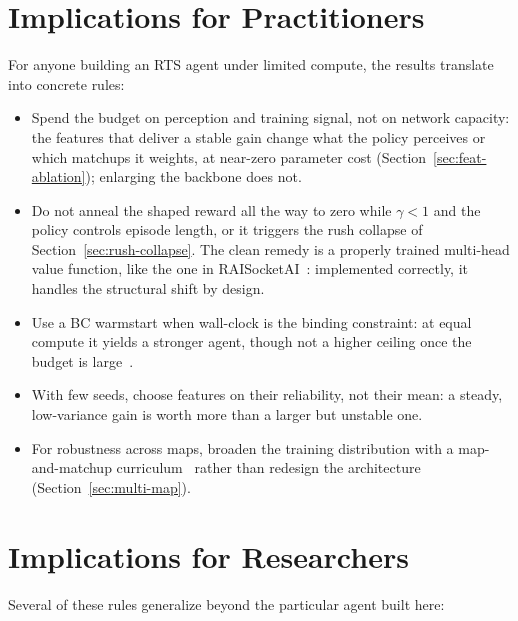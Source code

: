 \section{Implications for Practitioners}
\label{sec:disc-practitioners}

For anyone building an RTS agent under limited compute, the results translate into concrete rules:

\begin{itemize}\itemsep2pt
  \item Spend the budget on perception and training signal, not on network capacity: the features that deliver a stable gain change what the policy perceives or which matchups it weights, at near-zero parameter cost (Section~\ref{sec:feat-ablation}); enlarging the backbone does not.
  \item Do not anneal the shaped reward all the way to zero while $\gamma<1$ and the policy controls episode length, or it triggers the rush collapse of Section~\ref{sec:rush-collapse}. The clean remedy is a properly trained multi-head value function, like the one in RAISocketAI~\cite{goodfriendCompetitionWinningDeep2024}: implemented correctly, it handles the structural shift by design.
  \item Use a BC warmstart when wall-clock is the binding constraint: at equal compute it yields a stronger agent, though not a higher ceiling once the budget is large~\cite{fosterBehaviorCloningAll2024}.
  \item With few seeds, choose features on their reliability, not their mean: a steady, low-variance gain is worth more than a larger but unstable one.
  \item For robustness across maps, broaden the training distribution with a map-and-matchup curriculum~\cite{jiangPrioritizedLevelReplay2021} rather than redesign the architecture (Section~\ref{sec:multi-map}).
\end{itemize}

\section{Implications for Researchers}
\label{sec:disc-researchers}

Several of these rules generalize beyond the particular agent built here:

